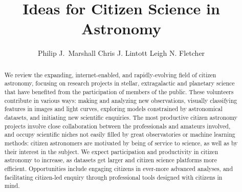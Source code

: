 \documentclass{ar2e}
\begin{document}

\jvol{}
\ARinfo{}

\title{Ideas for Citizen Science in Astronomy}

\author{%
Philip J.\ Marshall
Chris J. Lintott
Leigh N. Fletcher
}




\begin{abstract} 

We review the expanding, internet-enabled, and rapidly-evolving field of citizen
astronomy, focusing on research projects in stellar, extragalactic and 
planetary science that have benefited from the participation of members of the
public. These volunteers contribute in various ways: making and analyzing new
observations, visually classifying features in images and light curves,
exploring models constrained by astronomical datasets, and initiating new
scientific enquiries.  The most productive citizen astronomy projects involve
close collaboration between the professionals and amateurs involved, and occupy
scientific niches not easily filled by great observatories or machine learning
methods: citizen astronomers are motivated by being of service to science, as
well as by their interest in the subject. We expect participation and
productivity in citizen astronomy to increase, as datasets get larger and
citizen science platforms more efficient. Opportunities include engaging
citizens in ever-more advanced analyses, and facilitating citizen-led enquiry
through professional tools designed with citizens in mind.

\end{abstract}
\end{document}
